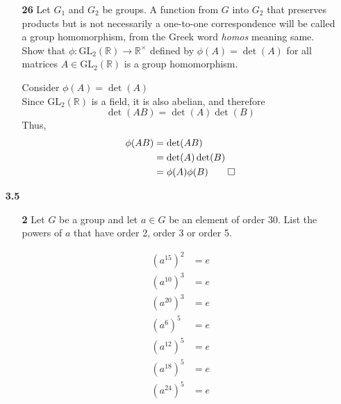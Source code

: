 \documentclass[paper=usletter, fontsize=12pt]{article}
\begin{document}
\begin{itemize}
\begin{itemize}
\begin{cproof}
            \end{cproof}

            \item[\textbf{26}] Let $G_1$ and $G_2$ be groups. A function from
            $G$ into $G_2$ that preserves products but is not necessarily a
            one-to-one correspondence will be called a group homomorphism, from
            the Greek word \textit{homos} meaning same. Show that $\phi:
            \text{GL}_2(\mathbb{R}) \rightarrow \mathbb{R}^{\times}$ defined by
            $\phi(A)=\det(A)$ for all matrices $A \in \text{GL}_2(\mathbb{R})$
            is a group homomorphism.
            \begin{cproof}

                Consider $\phi(A)=\det(A)$\\
                Since $\text{GL}_2(\mathbb{R})$ is a field, it is also abelian,
                and therefore
                \begin{equation*}
                    \det(AB) = \det(A)\det(B)
                \end{equation*}
                Thus,
                \begin{align*}
                    \phi(AB) & = \det(AB) \\
                    & = \det(A)\det(B)\\
                    & = \phi(A)\phi(B) \qedhere
                \end{align*}


            \end{cproof}

        \end{itemize}

        \item[\textbf{3.5}]

        \begin{itemize}

            \item[\textbf{2}] Let $G$ be a group and let $a \in G$ be an
            element of order 30. List the powers of $a$ that have order 2,
            order 3 or order 5.
            \begin{cproof}

                \begin{align*}
                    (a^{15})^{2} & = e
                \end{align*}
                \begin{align*}
                    (a^{10})^{3} & = e \\
                    (a^{20})^{3} & = e
                \end{align*}
                \begin{align*}
                    (a^{6})^{5} & = e \\
                    (a^{12})^{5} & = e \\
                    (a^{18})^{5} & = e \\
                    (a^{24})^{5} & = e
                \end{align*}


\end{cproof}
\end{itemize}
\end{itemize}
\end{document}

